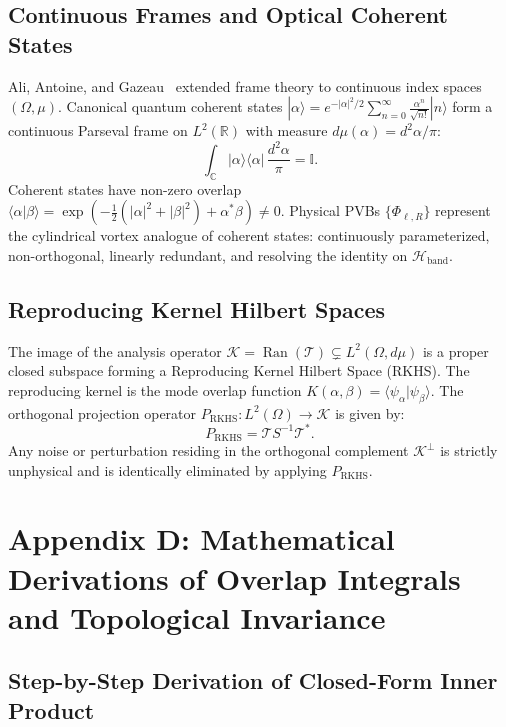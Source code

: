 \documentclass{optica-article}
\begin{document}
\subsection{Continuous Frames and Optical Coherent States}

Ali, Antoine, and Gazeau~\cite{Ali1993,Gazeau2009} extended frame theory to continuous index spaces $(\Omega, \mu)$. Canonical quantum coherent states $|\alpha\rangle = e^{-|\alpha|^2/2} \sum_{n=0}^\infty \frac{\alpha^n}{\sqrt{n!}} |n\rangle$ form a continuous Parseval frame on $L^2(\mathbb{R})$ with measure $d\mu(\alpha) = d^2\alpha / \pi$:
\begin{equation}
\int_{\mathbb{C}} |\alpha\rangle \langle \alpha| \, \frac{d^2\alpha}{\pi} = \mathbb{I}.
\end{equation}
Coherent states have non-zero overlap $\langle \alpha | \beta \rangle = \exp(-\frac{1}{2}(|\alpha|^2 + |\beta|^2) + \alpha^* \beta) \neq 0$. Physical PVBs $\{\Phi_{\ell, R}\}$ represent the cylindrical vortex analogue of coherent states: continuously parameterized, non-orthogonal, linearly redundant, and resolving the identity on $\mathcal{H}_{\text{band}}$.

\subsection{Reproducing Kernel Hilbert Spaces}

The image of the analysis operator $\mathcal{K} = \operatorname{Ran}(\mathcal{T}) \subsetneq L^2(\Omega, d\mu)$ is a proper closed subspace forming a Reproducing Kernel Hilbert Space (RKHS). The reproducing kernel is the mode overlap function $K(\alpha, \beta) = \langle \psi_\alpha | \psi_\beta \rangle$. The orthogonal projection operator $P_{\text{RKHS}}: L^2(\Omega) \to \mathcal{K}$ is given by:
\begin{equation}
P_{\text{RKHS}} = \mathcal{T} S^{-1} \mathcal{T}^*.
\end{equation}
Any noise or perturbation residing in the orthogonal complement $\mathcal{K}^\perp$ is strictly unphysical and is identically eliminated by applying $P_{\text{RKHS}}$.

\section{Appendix D: Mathematical Derivations of Overlap Integrals and Topological Invariance}
\label{app:derivations}

\subsection{Step-by-Step Derivation of Closed-Form Inner Product}
\end{document}

